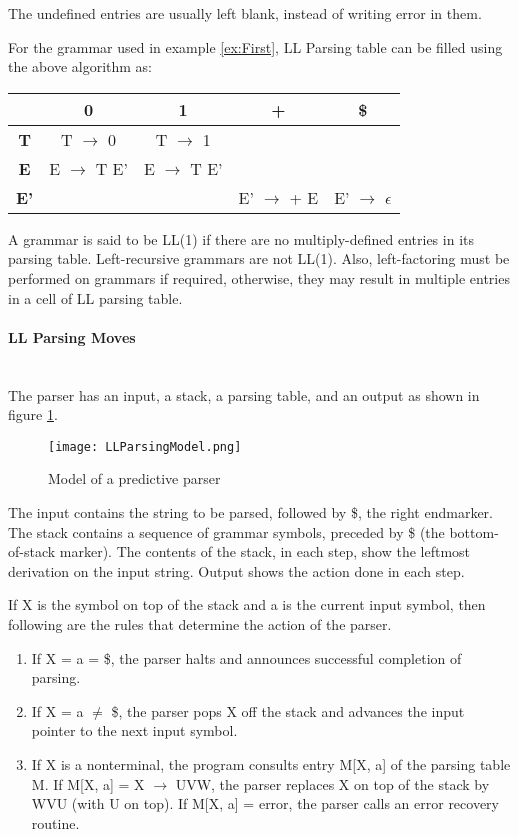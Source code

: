 The undefined entries are usually left blank, instead of writing error in them.
\begin{example}
\label{ex:LL table}
For the grammar used in example \ref{ex:First}, LL Parsing table can be filled using the above algorithm as:
\begin{center}
\begin{tabular}{ |c|c|c|c|c| } 
 \hline
  & \textbf{0} & \textbf{1} & \textbf{+} & \textbf{\$} \\
 \hline
 \textbf{T} & T $\to$ 0 & T $\to$ 1 &  &  \\
 \hline
 \textbf{E} & E $\to$ T E' & E $\to$ T E' &  &  \\
 \hline
 \textbf{E'} &  &  & E' $\to$ + E & E' $\to$ $\epsilon$ \\
 \hline
\end{tabular}
\end{center}
\end{example}
A grammar is said to be LL(1) if there are no multiply-defined entries in its parsing table. Left-recursive grammars are not LL(1). Also, left-factoring must be performed on grammars if required, otherwise, they may result in multiple entries in a cell of LL parsing table.

\paragraph{LL Parsing Moves}\mbox{}\\
\label{para: LL Parsing Moves}
The parser has an input, a stack, a parsing table, and an output as shown in figure \ref{fig:LL Parser}.
\begin{figure}
\centering
\texttt{[image: LLParsingModel.png]}
\caption{Model of a predictive parser}
\label{fig:LL Parser}
\end{figure}
The input contains the string to be parsed, followed by \$, the right endmarker. The stack contains a sequence of grammar symbols, preceded by \$ (the bottom-of-stack marker). The contents of the stack, in each step, show the leftmost derivation on the input string. Output shows the action done in each step.

If X is the symbol on top of the stack and a is the current input symbol, then following are the rules that determine the action of the parser.
\begin{enumerate}
\item If X = a = \$, the parser halts and announces successful completion of parsing.
\item If X = a $\neq$ \$, the parser pops X off the stack and advances the input pointer to the next input symbol.
\item If X is a nonterminal, the program consults entry M[X, a] of the parsing table M. If M[X, a] = {X $\to$ UVW}, the parser replaces X on top of the stack by WVU (with U on top). If M[X, a] = error, the parser calls an error recovery routine.
\end{enumerate}

